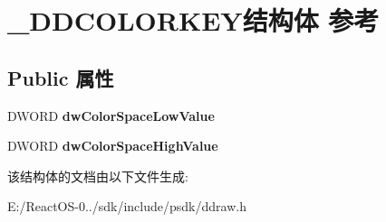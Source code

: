 \hypertarget{struct___d_d_c_o_l_o_r_k_e_y}{}\section{\+\_\+\+D\+D\+C\+O\+L\+O\+R\+K\+E\+Y结构体 参考}
\label{struct___d_d_c_o_l_o_r_k_e_y}
\subsection*{Public 属性}
\begin{DoxyCompactItemize}
\item 
\mbox{\label{struct___d_d_c_o_l_o_r_k_e_y_a7be37fae5a03216bf44c3e7af01880a6}} 
D\+W\+O\+RD {\bfseries dw\+Color\+Space\+Low\+Value}
\item 
\mbox{\label{struct___d_d_c_o_l_o_r_k_e_y_a28a95c4f317b8277017a4663e8320b77}} 
D\+W\+O\+RD {\bfseries dw\+Color\+Space\+High\+Value}
\end{DoxyCompactItemize}


该结构体的文档由以下文件生成\+:\begin{DoxyCompactItemize}
\item 
E\+:/\+React\+O\+S-\/0../sdk/include/psdk/ddraw.\+h\end{DoxyCompactItemize}
